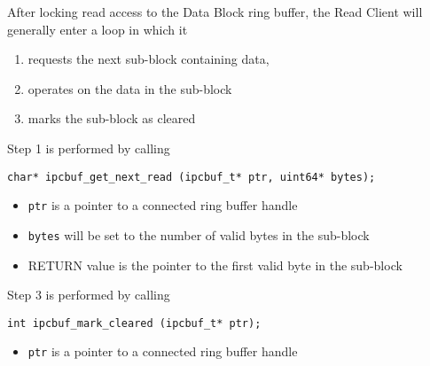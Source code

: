 After locking read access to the Data Block ring buffer, the Read Client
will generally enter a loop in which it
\begin{enumerate}
\item requests the next sub-block containing data, 
\vspace{-2mm}
\item operates on the data in the sub-block
\vspace{-2mm}
\item marks the sub-block as cleared
\end{enumerate}
Step 1 is performed by calling
\begin{verbatim}
char* ipcbuf_get_next_read (ipcbuf_t* ptr, uint64* bytes);
\end{verbatim}
\vspace{-6mm}
\begin{itemize}
\item {\tt ptr} is a pointer to a connected ring buffer handle
\vspace{-2mm}
\item {\tt bytes} will be set to the number of valid bytes in the sub-block
\vspace{-2mm}
\item RETURN value is the pointer to the first valid byte in the sub-block
\end{itemize}
Step 3 is performed by calling
\begin{verbatim}
int ipcbuf_mark_cleared (ipcbuf_t* ptr);
\end{verbatim}
\vspace{-6mm}
\begin{itemize}
\item {\tt ptr} is a pointer to a connected ring buffer handle
\end{itemize}
